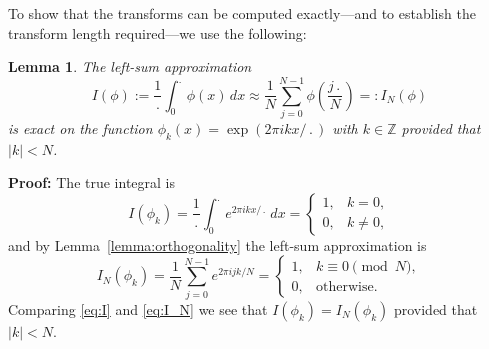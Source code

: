 \documentclass[12pt]{article}
\newtheorem{lemma}{Lemma}
\newenvironment{proof}{\par\noindent\textbf{Proof: }}{\hfill\qed\par}
\newcommand{\qed}{\fbox{\rule[-0.0ex]{0pt}{1.5ex}\hspace*{0.1em}}}
\newcommand{\Z}{\mathbb{Z}}
\newcommand{\abs}[1]{\left|{#1}\right|}
\begin{document}
To show that the transforms can be computed exactly---and to establish the
transform length required---we use the following:
\begin{lemma}\label{lemma:integration}
The left-sum approximation
\begin{equation}
   I(\phi) :=  \frac{1}{\period }\int_0^\period \phi(x)\,dx 
          \approx \frac{1}{N}\sum_{j=0}^{N-1}
          \phi\left(\frac{j\period}{N}\right) =: I_N(\phi)
\label{eq:lemma}
\end{equation}
is exact on the function $\phi_k(x) = \exp(2\pi ikx/\period)$ with $k\in\Z$
provided that $\abs{k}<N$.  
\end{lemma}
\begin{proof}
The true integral is
\begin{equation}
   I(\phi_k) =  \frac{1}{\period}\int_0^\period e^{2\pi ikx/\period} \,dx 
             = \begin{cases} 1, & \text{$k=0$},\\
                             0, & \text{$k\ne0$}, \end{cases}
\label{eq:I}
\end{equation}
and by Lemma~\ref{lemma:orthogonality} the left-sum approximation is
\begin{equation}
   I_N(\phi_k) = \frac{1}{N}\sum_{j=0}^{N-1} e^{2\pi ijk/N} 
               = \begin{cases} 1, & \text{$k\equiv0\pmod{N}$},\\
                               0, & \text{otherwise}. \end{cases}
\label{eq:I_N}
\end{equation}
Comparing \eqref{eq:I} and \eqref{eq:I_N} we see that $I(\phi_k)=I_N(\phi_k)$
provided that $\abs{k}<N$.  
\end{proof}
\end{document}

